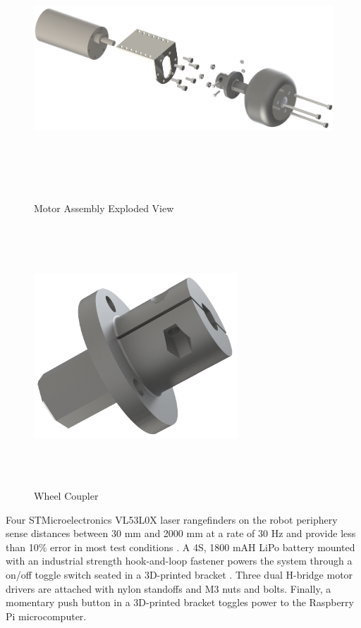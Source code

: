 \begin{figure}[H]   %
	\centering \includegraphics[width=6in, height=3.85in, keepaspectratio]{figures/motor_assem_explode.png}
	\caption{Motor Assembly Exploded View}	\label{fig:motor_assem_explode}
\end{figure}
\begin{figure}[H]   %
	\centering \includegraphics[width=3in, height=3.85in, keepaspectratio]{figures/wheel_coupler.png}
	\caption{Wheel Coupler}	\label{fig:wheel_coupler}
\end{figure}

Four STMicroelectronics VL53L0X laser rangefinders on the robot periphery sense distances between 30 mm and 2000 mm at a rate of 30 Hz and provide less than 10\% error in most test conditions \cite{vl53l0x_datasheet}. A 4S, 1800 mAH LiPo battery mounted with an industrial strength hook-and-loop fastener powers the system through a on/off toggle switch seated in a 3D-printed bracket \cite{battery}. Three dual H-bridge motor drivers are attached with nylon standoffs and M3 nuts and bolts. Finally, a momentary push button in a 3D-printed bracket toggles power to the Raspberry Pi microcomputer.

